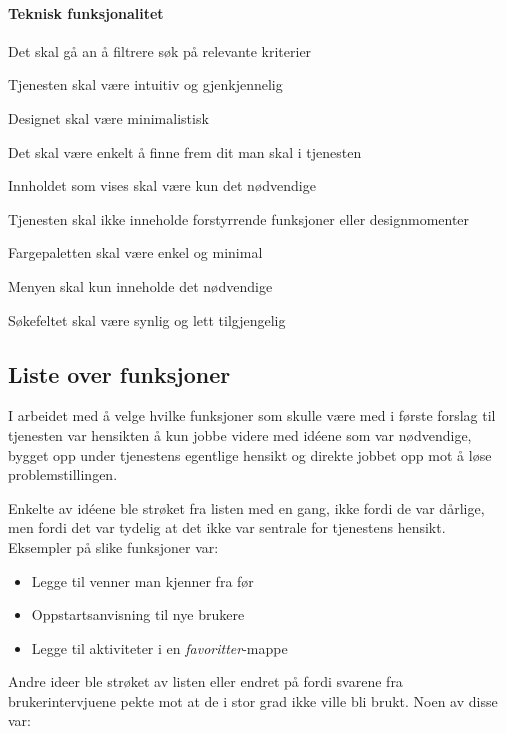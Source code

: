 \paragraph{Teknisk funksjonalitet}
\begin{compactitem}
\item Det skal gå an å filtrere søk på relevante kriterier
\item Tjenesten skal være intuitiv og gjenkjennelig
\item Designet skal være minimalistisk
\item Det skal være enkelt å finne frem dit man skal i tjenesten
\item Innholdet som vises skal være kun det nødvendige
\item Tjenesten skal ikke inneholde forstyrrende funksjoner eller designmomenter
\item Fargepaletten skal være enkel og minimal
\item Menyen skal kun inneholde det nødvendige
\item Søkefeltet skal være synlig og lett tilgjengelig
\end{compactitem}

\subsection{Liste over funksjoner}
\label{section:forslag1-liste-over-funksjoner}
I arbeidet med å velge hvilke funksjoner som skulle være med i første forslag til tjenesten var hensikten å kun jobbe videre med idéene som var nødvendige, bygget opp under tjenestens egentlige hensikt og direkte jobbet opp mot å løse problemstillingen.

Enkelte av idéene ble strøket fra listen med en gang, ikke fordi de var dårlige, men fordi det var tydelig at det ikke var sentrale for tjenestens hensikt. Eksempler på slike funksjoner var:

\begin{itemize}
    \item Legge til venner man kjenner fra før
    \item Oppstartsanvisning til nye brukere
    \item Legge til aktiviteter i en {\em favoritter}-mappe
\end{itemize}

Andre ideer ble strøket av listen eller endret på fordi svarene fra brukerintervjuene pekte mot at de i stor grad ikke ville bli brukt. Noen av disse var:


